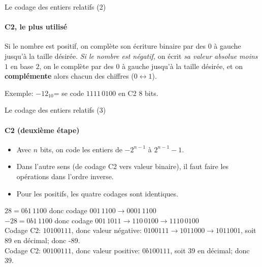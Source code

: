 \begin{frame}{Le codage des entiers relatifs (2)}
  \framesubtitle{C2, le plus utilisé}
  \begin{definition}
    Si le nombre est positif, on complète son écriture binaire par des $0$ à
    gauche jusqu'à la taille désirée. \emph{Si le nombre est négatif,} on
    écrit \emph{sa valeur absolue moins $1$} en base $2$, on le complète par
    des $0$ à gauche jusqu'à la taille désirée, et on \textbf{complémente}
    alors chacun des chiffres ($0\leftrightarrow1$).

    Exemple: $-12_{10}$= se code $1111\,0100$ en C2 8 bits.
  \end{definition}
\end{frame}
\begin{frame}{Le codage des entiers relatifs (3)}
  \framesubtitle{C2 (deuxième étape)}
  \begin{itemize}
  \item Avec $n$ bits, on code les entiers de $-2^{n-1}$ à $2^{n-1}-1$.
  \item Dans l'autre sens (de codage C2 vers valeur binaire), il faut faire les
    opérations dans l'ordre inverse.
  \item Pour les positifs, les quatre codages sont identiques.
  \end{itemize}
  \begin{example}
    $28=0b1\,1100$ donc codage $001\,1100\rightarrow0001\,1100$\\
    $-28=0b1\,1100$ donc codage
    $001\,1011\rightarrow110\,0100\rightarrow1110\,0100$\\
    Codage C2: $10100111$, donc valeur négative:
    $0100111\rightarrow1011000\rightarrow1011001$, soit 89 en décimal;
    donc -89.\\
    Codage C2: $00100111$, donc valeur positive: $0b100111$, soit 39 en
    décimal; donc 39.
  \end{example}
\end{frame}
